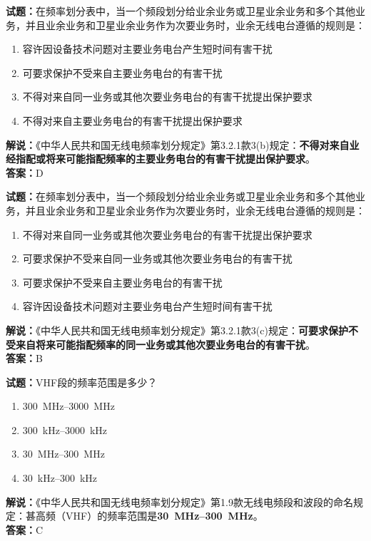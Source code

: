 \documentclass{ctexbook}
\begin{document}
\bigskip

\noindent\textbf{试题：}在频率划分表中，当一个频段划分给业余业务或卫星业余业务和多个其他业务，并且业余业务和卫星业余业务作为次要业务时，业余无线电台遵循的规则是：
\begin{enumerate}[leftmargin=3em]
  \item 容许因设备技术问题对主要业务电台产生短时间有害干扰
  \item 可要求保护不受来自主要业务电台的有害干扰
  \item 不得对来自同一业务或其他次要业务电台的有害干扰提出保护要求
  \item 不得对来自主要业务电台的有害干扰提出保护要求
\end{enumerate}
\noindent\textbf{解说：}《中华人民共和国无线电频率划分规定》第3.2.1款3(b)规定：\textbf{不得对来自业经指配或将来可能指配频率的主要业务电台的有害干扰提出保护要求}。\\\textbf{答案：}D

\bigskip

\noindent\textbf{试题：}在频率划分表中，当一个频段划分给业余业务或卫星业余业务和多个其他业务，并且业余业务和卫星业余业务作为次要业务时，业余无线电台遵循的规则是：
\begin{enumerate}[leftmargin=3em]
  \item 不得对来自同一业务或其他次要业务电台的有害干扰提出保护要求
  \item 可要求保护不受来自同一业务或其他次要业务电台的有害干扰
  \item 可要求保护不受来自主要业务电台的有害干扰
  \item 容许因设备技术问题对主要业务电台产生短时间有害干扰
\end{enumerate}
\noindent\textbf{解说：}《中华人民共和国无线电频率划分规定》第3.2.1款3(c)规定：\textbf{可要求保护不受来自将来可能指配频率的同一业务或其他次要业务电台的有害干扰}。\\
\textbf{答案：}B

\bigskip

\noindent\textbf{试题：}VHF段的频率范围是多少？
\begin{enumerate}[leftmargin=3em]
  \item \qtyrange[range-phrase=\mbox{到}]{300}{3000}{\MHz}
  \item \qtyrange[range-phrase=\mbox{到}]{300}{3000}{\kHz}
  \item \qtyrange[range-phrase=\mbox{到}]{30}{300}{\MHz}
  \item \qtyrange[range-phrase=\mbox{到}]{30}{300}{\kHz}
\end{enumerate}
\noindent\textbf{解说：}《中华人民共和国无线电频率划分规定》第1.9款无线电频段和波段的命名规定：甚高频（VHF）的频率范围是\textbf{\qtyrange[range-phrase=\mbox{到}]{30}{300}{\MHz}}。\\\noindent\textbf{答案：}C
\end{document}
